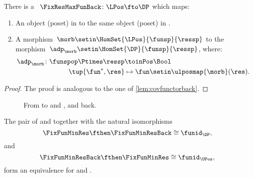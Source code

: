 \begin{lemma}
    \label{lem:cofunctorback}
    There is a ~$\FixResMaxFunBack\colon \LPos \fto \DP$ which maps:
    \begin{enumerate}
        \item An object (poset) in \UPos to the same object (poset) in \DP.
        \item A morphism~$\morb\setin \HomSet{\LPos}{\funsp}{\ressp}$ to the morphism~$\adp_\morb \setin \HomSet{\DP}{\funsp}{\ressp}$, where:
              \begin{equation}
                  \begin{aligned}
                      \adp_\morb\colon \funspop \Ptimes \ressp & \toinPos \Bool \\
                      \tup{\fun^*,\res}                        & \mapsto \fun \setin \ulposmap{\morb}(\res).
                  \end{aligned}
              \end{equation}
    \end{enumerate}
\end{lemma}

\begin{proof}
    The proof is analogous to the one of \cref{lem:covfunctorback}.
\end{proof}

\begin{figure}[tbh]
    \centering
    \caption{From \DP to \UPos and \LPos, and back.}
\end{figure}


\begin{lemma}
    The pair of \FixFunMinRes and \FixFunMinResBack together with the natural isomorphisms
    \begin{equation}
        \FixFunMinRes \fthen \FixFunMinResBack \cong \funid_\DP,
    \end{equation}
    and
    \begin{equation}
        \FixFunMinResBack \fthen \FixFunMinRes \cong \funid_\UPos,
    \end{equation}
    form an equivalence for \DP and \UPos.
\end{lemma}

